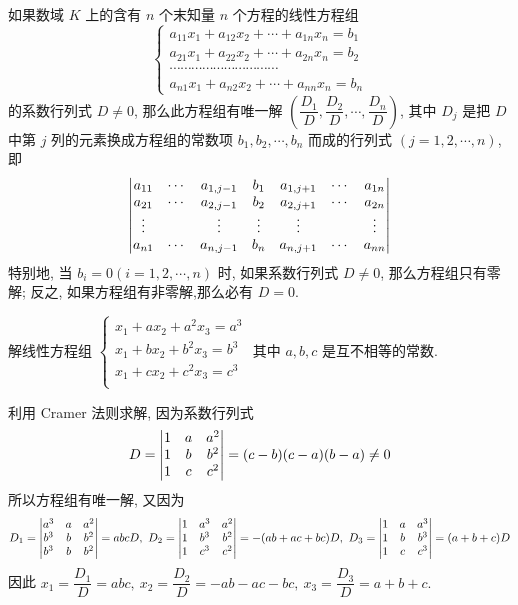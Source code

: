 \begin{theorem}[Cramer 法则]
    如果数域 $ K $ 上的含有 $ n $ 个末知量 $ n $ 个方程的线性方程组
    $$\begin{cases}
            a_{11} x_{1}+a_{12} x_{2}+\cdots+a_{1 n} x_{n}=b_{1}                  \\
            a_{21} x_{1}+a_{22} x_{2}+\cdots+a_{2 n} x_{n}=b_{2}                  \\
            \cdots \cdots \cdots \cdots \cdots \cdots \cdots \cdots \cdots \cdots \\
            a_{n 1} x_{1}+a_{n 2} x_{2}+\cdots+a_{n n} x_{n}=b_{n}
        \end{cases}$$
    的系数行列式 $ D \neq 0$, 那么此方程组有唯一解 $ \left(\dfrac{D_{1}}{D}, \dfrac{D_{2}}{D}, \cdots, \dfrac{D_{n}}{D}\right)$,
    其中 $ D_{j} $ 是把 $ D $ 中第 $ j $ 列的元素换成方程组的常数项 $ b_{1}, b_{2}, \cdots, b_{n} $ 而成的行列式 $ (j=1,2, \cdots, n)$, 即
    $$\mqty|a_{11}  & \cdots & a_{1, j-1} & b_{1}  & a_{1, j+1} & \cdots & a_{1 n} \\
        a_{21}  & \cdots & a_{2, j-1} & b_{2}  & a_{2, j+1} & \cdots & a_{2 n} \\
        \vdots  &        & \vdots     & \vdots & \vdots     &        & \vdots  \\
        a_{n 1} & \cdots & a_{n, j-1} & b_{n}  & a_{n, j+1} & \cdots & a_{n n}|$$
    特别地, 当 $ b_{i}=0(i=1,2, \cdots, n) $ 时, 如果系数行列式 $ D \neq 0 $, 那么方程组只有零解;
    反之, 如果方程组有非零解,那么必有 $ D=0 .$
\end{theorem}

\begin{example}[2005 华中科技大学]
    解线性方程组 $\begin{cases}
            x_1+ax_2+a^2x_3=a^3 \\
            x_1+bx_2+b^2x_3=b^3 \\
            x_1+cx_2+c^2x_3=c^3 \\
        \end{cases}$
    其中 $a,b,c$ 是互不相等的常数.
\end{example}
\begin{solution}
    利用 Cramer 法则求解, 因为系数行列式 $$D=\mqty|1&a&a^2\\1&b&b^2\\1&c&c^2|=(c-b)(c-a)(b-a)\neq0$$
    所以方程组有唯一解, 又因为
    $$D_1=\mqty|a^3&a&a^2\\b^3&b&b^2\\b^3&b&b^2|=abcD,~D_2=\mqty|1&a^3&a^2\\1&b^3&b^2\\1&c^3&c^2|=-(ab+ac+bc)D,~D_3=\mqty|1&a&a^3\\1&b&b^3\\1&c&c^3|=(a+b+c)D$$
    因此 $x_1=\dfrac{D_1}{D}=abc,~x_2=\dfrac{D_2}{D}=-ab-ac-bc,~x_3=\dfrac{D_3}{D}=a+b+c.$
\end{solution}

